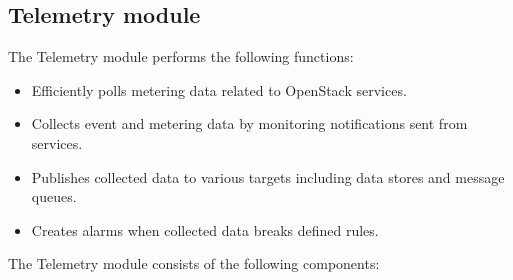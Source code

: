     \subsection{Telemetry module}
    
    \par The Telemetry module performs the following functions:
    
        \begin{itemize}
            \item Efficiently polls metering data related to OpenStack services.
    
            \item Collects event and metering data by monitoring notifications sent from services.
    
            \item Publishes collected data to various targets including data stores and message queues.
    
            \item  Creates alarms when collected data breaks defined rules.
        \end{itemize}
    
    \par The Telemetry module consists of the following components:
    
